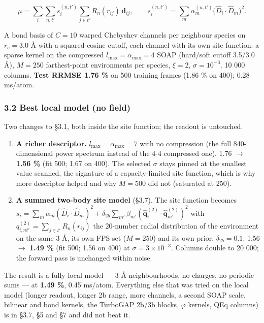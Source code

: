 \documentclass[
  10pt,
]{article}
\providecommand{\tightlist}{%
  \setlength{\itemsep}{0pt}\setlength{\parskip}{0pt}}
\providecommand{\tightlist}{\setlength{\itemsep}{0pt}\setlength{\parskip}{0pt}}
\begin{document}
\[
\mu=\sum_i\sum_{n,t'} s^{(n,t')}_i\sum_{j\in t'}R_n(r_{ij})\,\mathbf d_{ij},
\qquad
s^{(n,t')}_i=\sum_m\alpha^{(n,t')}_m\big(\hat D_i\cdot\hat D_m\big)^2 .
\]

A bond basis of \(C=10\) warped Chebyshev channels per neighbour species on \(r_c=3.0\) \AA{} with a
squared-cosine cutoff, each channel with its own site function: a sparse kernel on the compressed
\(l_{\max}=\alpha_{\max}=4\) SOAP (hard/soft cutoff 3.5/3.0 \AA{}), \(M=250\) farthest-point
environments per species, \(\xi=2\), \(\sigma=10^{-3}\). 10 000 columns. \textbf{Test RRMSE 1.76 \%}
on 500 training frames (1.86 \% on 400); 0.28 ms/atom.

\subsubsection{3.2 Best local model (no field)}\label{best-local-model-no-field}

Two changes to §3.1, both inside the site function; the readout is untouched.

\begin{enumerate}
\def\labelenumi{\arabic{enumi}.}
\tightlist
\item
  \textbf{A richer descriptor.} \(l_{\max}=\alpha_{\max}=7\) with no compression (the full
  840-dimensional power spectrum instead of the 4-4 compressed one). 1.76 \(\rightarrow\)
  \textbf{1.56 \%} (fit 500; 1.67 on 400). The selected \(\sigma\) stays pinned at the smallest
  value scanned, the signature of a capacity-limited site function, which is why more descriptor
  helped and why \(M=500\) did not (saturated at 250).
\item
  \textbf{A summed two-body site model} (§3.7). The site function becomes
  \(s_i=\sum_m\alpha_m(\hat D_i\!\cdot\!\hat D_m)^2+\delta_{2b}\sum_{m'}\beta_{m'}(\hat{\mathbf q}^{(2)}_i\!\cdot\!\hat{\mathbf q}^{(2)}_{m'})^2\)
  with \(q^{(2)}_{i,nt'}=\sum_{j\in t'}R_n(r_{ij})\) the 20-number radial distribution of the
  environment on the same 3 \AA{}, its own FPS set (\(M=250\)) and its own prior,
  \(\delta_{2b}=0.1\). 1.56 \(\rightarrow\) \textbf{1.49 \%} (fit 500; 1.56 on 400) at
  \(\sigma=3\times10^{-3}\). Columns double to 20 000; the forward pass is unchanged within noise.
\end{enumerate}

The result is a fully local model --- 3 \AA{} neighbourhoods, no charges, no periodic sums --- at
\textbf{1.49 \%}, 0.45 ms/atom. Everything else that was tried on the local model (longer readout,
longer 2b range, more channels, a second SOAP scale, bilinear and bond kernels, the TurboGAP 2b/3b
blocks, \(\varphi\) kernels, QEq columns) is in §3.7, §5 and §7 and did not beat it.
\end{document}
